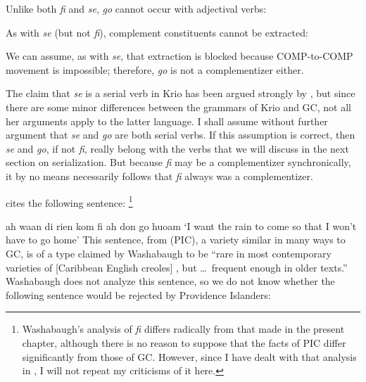 \z
Unlike both \textit{fi} and \textit{se}, \textit{go} cannot occur with adjectival verbs:

\z

\z

\z
As with \textit{se} (but not \textit{fi}), complement constituents cannot be extracted:


\z

\z

\z
We can assume, as with \textit{se}, that extraction is blocked because COMP-to-COMP movement is impossible; therefore, \textit{go} is not a complementizer either.

The claim that \textit{se} is a serial verb in Krio has been argued strongly by \citet{Larimore1976}, but since there are some minor differences between the grammars of Krio and GC, not all her arguments apply to the latter language. I shall assume without further argument that \textit{se} and \textit{go} are both serial verbs. If this assumption is correct, then \textit{se} and \textit{go}, if not \textit{fi}, really belong with the verbs that we will discuss in the next section on serialization. But because \textit{fi} may be a complementizer synchronically, it by no means necessarily follows that \textit{fi} always was a complementizer.

\citet[Example 9]{Washabaugh1979} cites the following sentence: \footnote{Washabaugh's analysis of \textit{fi} differs radically from that made in the present chapter, although there is no reason to suppose that the facts of PIC differ significantly from those of GC. However, since I have dealt with that analysis in \citet{Bickerton1980}, I will not repeat my criticisms of it here.}

\ea\label{ex:2:220}
ah waan di rien kom fi ah don go huoam
\glt `I want the rain to come so that I won't have to go home'
\z
This sentence, from  (PIC), a variety similar in many ways to GC, is of a type claimed by Washabaugh to be ``rare in most contemporary varieties of [Caribbean English creoles] , but \ldots~frequent enough in older texts.'' Washabaugh does not analyze this sentence, so we do not know whether the following sentence would be rejected by Providence Islanders:

